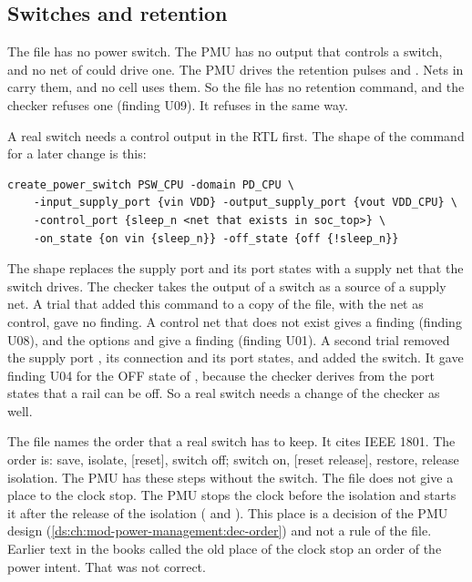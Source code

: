 \subsection{Switches and retention}
The file has no power switch. The PMU has no output that controls a switch, and no net of  could drive one. The PMU drives the retention pulses  and . Nets in  carry them, and no cell uses them. So the file has no retention command, and the checker refuses one (finding U09). It refuses  in the same way.

A real switch needs a control output in the RTL first. The shape of the command for a later change is this:
\begin{lstlisting}
create_power_switch PSW_CPU -domain PD_CPU \
    -input_supply_port {vin VDD} -output_supply_port {vout VDD_CPU} \
    -control_port {sleep_n <net that exists in soc_top>} \
    -on_state {on vin {sleep_n}} -off_state {off {!sleep_n}}
\end{lstlisting}
The shape replaces the supply port \code{VDD_CPU} and its port states with a supply net that the switch drives. The checker takes the output of a switch as a source of a supply net. A trial that added this command to a copy of the file, with the net  as control, gave no finding. A control net that does not exist gives a finding (finding U08), and the options  and  give a finding (finding U01). A second trial removed the supply port , its connection and its port states, and added the switch. It gave finding U04 for the OFF state of , because the checker derives from the port states that a rail can be off. So a real switch needs a change of the checker as well.

The file names the order that a real switch has to keep. It cites IEEE 1801. The order is: save, isolate, [reset], switch off; switch on, [reset release], restore, release isolation. The PMU has these steps without the switch. The file does not give a place to the clock stop. The PMU stops the clock before the isolation and starts it after the release of the isolation ( and ). This place is a decision of the PMU design (\cref{ds:ch:mod-power-management:dec-order}) and not a rule of the file. Earlier text in the books called the old place of the clock stop an order of the power intent. That was not correct.

